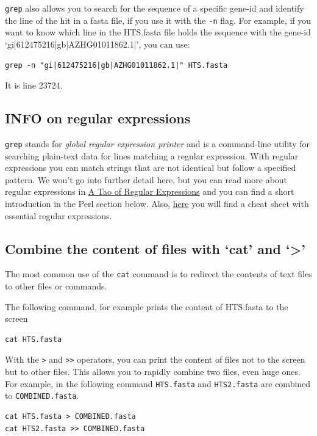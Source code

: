 \documentclass[11pt]{article}
\begin{document}
\texttt{grep} also allows you to search for the sequence of a specific
gene-id and identify the line of the hit in a fasta file, if you use
it with the \texttt{-n} flag. For example, if you want to know which line
in the HTS.fasta file holds the sequence with the gene-id
`gi|612475216|gb|AZHG01011862.1|', you can use:


\begin{verbatim}
grep -n "gi|612475216|gb|AZHG01011862.1|" HTS.fasta
\end{verbatim}

It is line 23724.
\subsection{INFO on regular expressions}
\label{sec-4-3}


\texttt{grep} stands for \emph{global regular expression printer} and is a
command-line utility for searching plain-text data for lines matching
a regular expression. With regular expressions you can match strings
that are not identical but follow a specified pattern.  We won't
go into further detail here, but you can read more about regular
expressions in \href{http://www.scootersoftware.com/RegEx.html}{A Tao of Regular Expressions} and you can find a 
short introduction in the Perl section below. Also, \href{http://www.cheatography.com/davechild/cheat-sheets/regular-expressions/}{here} you will find
a cheat sheet with essential regular expressions.
\subsection{Combine the content of files with `cat' and `>'}
\label{sec-4-4}

The most common use of the \texttt{cat} command is to redirect the contents of
text files to other files or commands.

The following command, for example prints the content of HTS.fasta to the screen


\begin{verbatim}
cat HTS.fasta
\end{verbatim}

With the \texttt{>} and \texttt{>>} operators, you can print the content of files
not to the screen but to other files. This allows you to rapidly combine
two files, even huge ones. For example, in the following command
\texttt{HTS.fasta} and \texttt{HTS2.fasta} are combined to
\texttt{COMBINED.fasta}.


\begin{verbatim}
cat HTS.fasta > COMBINED.fasta
cat HTS2.fasta >> COMBINED.fasta
\end{verbatim}
\end{document}
